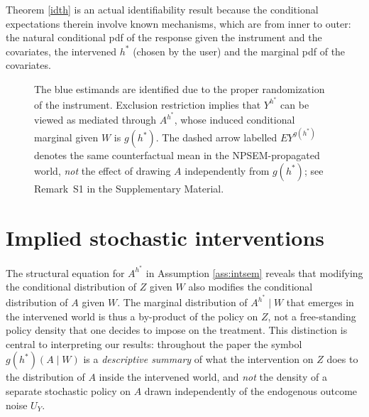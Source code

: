 \documentclass[12pt]{article}
\theoremstyle{thmstyleone}%
\theoremstyle{thmstyletwo}%
\theoremstyle{thmstylethree}%
\begin{document}
Theorem \ref{idth} is an actual identifiability result because the conditional expectations therein involve known mechanisms, which are from inner to outer: the natural conditional pdf of the response given the instrument and the covariates, the intervened $h^*$ (chosen by the user) and the marginal pdf of the covariates. 


\begin{figure}[t!]
\centering
{}
\hspace{1.5em}
\caption{The blue estimands are identified due to the proper randomization of the instrument.  {Exclusion restriction implies that $Y^{h^*}$ can be viewed as mediated through $A^{h^*}$, whose induced conditional marginal given $W$ is $g(h^*)$. The dashed arrow labelled $EY^{g(h^*)}$ denotes the same counterfactual mean in the NPSEM-propagated world, \emph{not} the effect of drawing $A$ independently from $g(h^*)$; see Remark~S1 in the Supplementary Material.}}\label{fig:envs}

\end{figure}



\section{Implied stochastic interventions}\label{sec:implied}

The structural equation for $A^{h^*}$ in Assumption \ref{ass:intsem} reveals that  {modifying} the conditional distribution of $Z$ given $W$  {also modifies} the conditional distribution of $A$ given $W$.  {The marginal distribution of $A^{h^*}\mid W$ that emerges in the intervened world is thus a by-product of the policy on $Z$, not a free-standing policy density that one decides to impose on the treatment. This distinction is central to interpreting our results: throughout the paper the symbol $g(h^*)(A\mid W)$ is a \emph{descriptive summary} of what the intervention on $Z$ does to the distribution of $A$ inside the intervened world, and \emph{not} the density of a separate stochastic policy on $A$ drawn independently of the endogenous outcome noise $U_Y$.}
\end{document}
